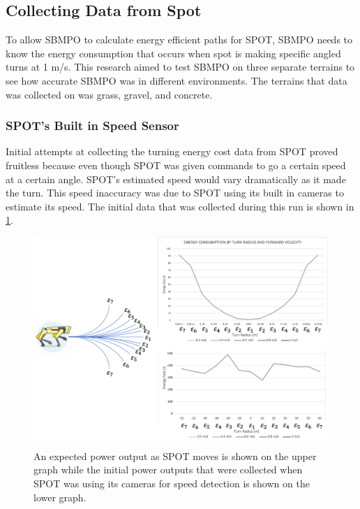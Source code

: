 \documentclass[conference]{IEEEtran}
\begin{document}
    \subsection{Collecting Data from Spot}
        To allow SBMPO to calculate energy efficient paths for SPOT, SBMPO needs to know the energy consumption that occurs when spot is making specific angled turns at 1 m/s. This research aimed to test SBMPO on three separate terrains to see how accurate SBMPO was in different environments. The terrains that data was collected on was grass, gravel, and concrete. 
        
        \subsubsection{SPOT's Built in Speed Sensor}
            Initial attempts at collecting the turning energy cost data from SPOT proved fruitless because even though SPOT was given commands to go a certain speed at a certain angle. SPOT's estimated speed would vary dramatically as it made the turn. This speed inaccuracy was due to SPOT using its built in cameras to estimate its speed. The initial data that was collected during this run is shown in \ref{fig:cameraPowerCost}. 
            
            \begin{figure}[ht]
                \centering
                \includegraphics[width=\linewidth]{turnRadius.png}
                \caption{An expected power output as SPOT moves is shown on the upper graph while the initial power outputs that were collected when SPOT was using its cameras for speed detection is shown on the lower graph.}
                \label{fig:cameraPowerCost}
            \end{figure}
            
\end{document}
